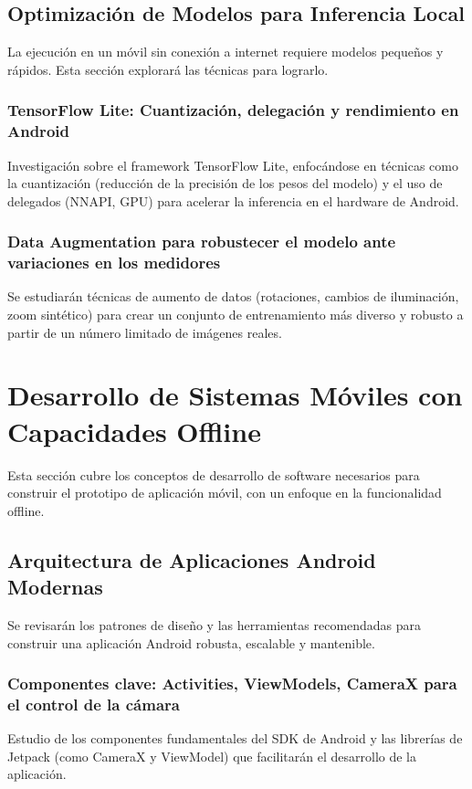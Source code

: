 \subsection{Optimización de Modelos para Inferencia Local}
\label{ssec:optimizacion_modelos}
La ejecución en un móvil sin conexión a internet requiere modelos pequeños y rápidos. Esta sección explorará las técnicas para lograrlo.

\subsubsection{TensorFlow Lite: Cuantización, delegación y rendimiento en Android}
\label{sssec:tflite}
Investigación sobre el framework TensorFlow Lite, enfocándose en técnicas como la cuantización (reducción de la precisión de los pesos del modelo) y el uso de delegados (NNAPI, GPU) para acelerar la inferencia en el hardware de Android.

\subsubsection{Data Augmentation para robustecer el modelo ante variaciones en los medidores}
\label{sssec:data_augmentation}
Se estudiarán técnicas de aumento de datos (rotaciones, cambios de iluminación, zoom sintético) para crear un conjunto de entrenamiento más diverso y robusto a partir de un número limitado de imágenes reales.

\section{Desarrollo de Sistemas Móviles con Capacidades Offline}
\label{sec:desarrollo_movil}
Esta sección cubre los conceptos de desarrollo de software necesarios para construir el prototipo de aplicación móvil, con un enfoque en la funcionalidad offline.

\subsection{Arquitectura de Aplicaciones Android Modernas}
\label{ssec:arquitectura_android}
Se revisarán los patrones de diseño y las herramientas recomendadas para construir una aplicación Android robusta, escalable y mantenible.

\subsubsection{Componentes clave: Activities, ViewModels, CameraX para el control de la cámara}
\label{sssec:android_componentes}
Estudio de los componentes fundamentales del SDK de Android y las librerías de Jetpack (como CameraX y ViewModel) que facilitarán el desarrollo de la aplicación.

